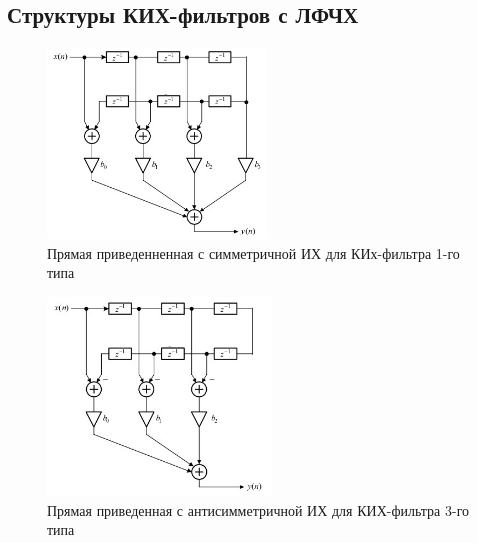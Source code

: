 \documentclass[a4paper, 14pt]{extarticle}
\begin{document}
\clearpage
\subsection{Структуры КИХ-фильтров с ЛФЧХ}
\begin{figure}[h]
    \centering
    \includegraphics[width=0.52\textwidth]{img/S010.jpg}
    \caption{Прямая приведенненная с симметричной ИХ для КИх-фильтра 1-го типа}%
\end{figure}

\begin{figure}[h]
    \centering
    \includegraphics[width=0.53\textwidth]{img/S011.jpg}
    \caption{Прямая приведенная с антисимметричной ИХ для КИХ-фильтра 3-го типа}%
\end{figure}
\FloatBarrier{}
\end{document}
